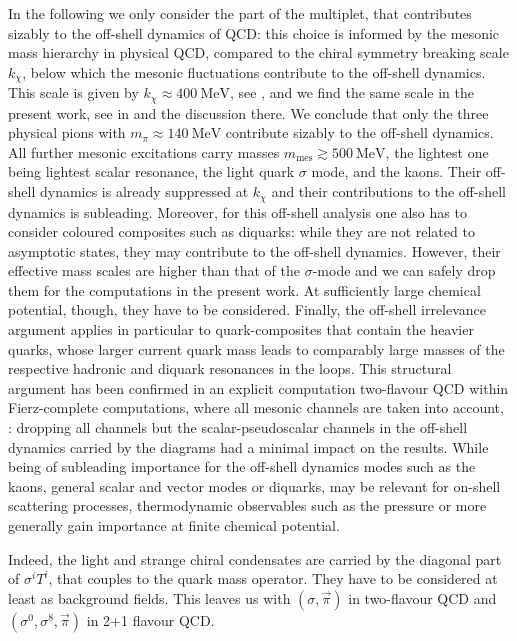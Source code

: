\documentclass[aps,twocolumn,prd,superscriptaddress]{revtex4-2}
\begin{document}
In the following we only consider the part of the multiplet, that contributes sizably to the off-shell dynamics of QCD: this choice is informed by the mesonic mass hierarchy in physical QCD, compared to the chiral symmetry breaking scale $k_\chi$, below which the mesonic fluctuations contribute to the off-shell dynamics. This scale is given by $k_\chi\approx \qty{400}{\MeV}$, see \cite{Cyrol:2017ewj, Fu:2019hdw}, and we find the same scale in the present work, see  in  and the discussion there. We conclude that only the three physical pions with $m_\pi \approx \qty{140}{\MeV}$ contribute sizably to the off-shell dynamics. All further mesonic excitations carry masses $m_\textrm{mes} \gtrsim \qty{500}{\MeV}$, the lightest one being lightest scalar resonance, the light quark $\sigma$ mode, and the kaons. Their off-shell dynamics is already suppressed at $k_\chi$ and their contributions to the off-shell dynamics is subleading. Moreover, for this off-shell analysis one also has to consider coloured composites such as diquarks: while they are not related to asymptotic states, they may contribute to the off-shell dynamics. However, their effective mass scales are higher than that of the $\sigma$-mode and we can safely drop them for the computations in the present work. At sufficiently large chemical potential, though, they have to be considered. Finally, the off-shell irrelevance argument applies in particular to quark-composites that contain the heavier quarks, whose larger current quark mass leads to comparably large masses of the respective hadronic and diquark resonances in the loops. This structural argument has been confirmed in an explicit computation two-flavour QCD within Fierz-complete computations, where all mesonic channels are taken into account, \cite{Mitter:2014wpa, Cyrol:2017ewj}: dropping all channels but the scalar-pseudoscalar channels in the off-shell dynamics carried by the diagrams had a minimal impact on the results. While being of subleading importance for the off-shell dynamics modes such as the kaons, general scalar and vector modes or diquarks, may be relevant for on-shell scattering processes, thermodynamic observables such as the pressure or more generally gain importance at finite chemical potential. 

Indeed, the light and strange chiral condensates are carried by the diagonal part of $\sigma^i T^i$, that couples to the quark mass operator. They have to be considered at least as background fields. This leaves us with $(\sigma,\vec \pi)$ in two-flavour QCD and $(\sigma^0,\sigma^8,\vec \pi)$ in 2+1 flavour QCD. 
\end{document}
